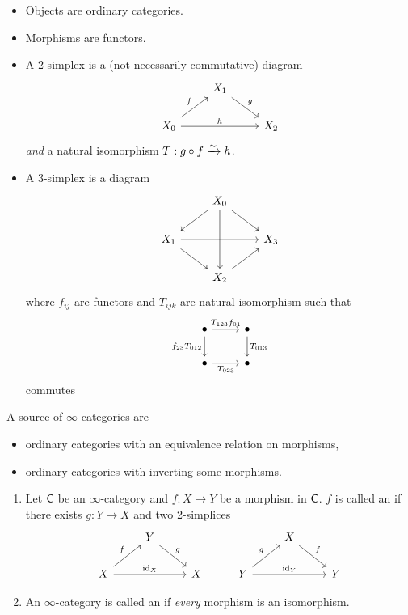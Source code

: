 \begin{example}
\begin{enumerate}[1)]
			\begin{itemize}
				\item Objects are ordinary categories.
				\item Morphisms are functors. 
				\item A 2-simplex is a (not necessarily commutative) diagram
					\[
					\begin{tikzcd}
						& X_1 \ar[dr,"g"] \\
						X_0 \ar[ur,"f"] \ar[rr,"h"] & & X_2
					\end{tikzcd}
					\] 
					\emph{and} a natural isomorphism $T:g\circ f \xrightarrow{\sim} h$.
				\item A 3-simplex is a diagram
					\[
					\begin{tikzcd}
						& X_0 \ar[dl] \ar[dr] \ar[dd] \\
						X_1 \ar[rr] \ar[dr] & & X_3 \\
								    & X_2 \ar[ur]
					\end{tikzcd}
					\]
					where $f_{ij}$ are functors and $T_{ijk}$ are natural isomorphism such that
					\[
					\begin{tikzcd}
						\bullet \ar[r,"T_{123}f_{01}"] \ar[d,"f_{23}T_{012}"'] & \bullet \ar[d,"T_{013}"] \\
						\bullet \ar[r,"T_{023}"'] & \bullet
					\end{tikzcd}
					\] 
					commutes
			\end{itemize}
	\end{enumerate}
\end{example}
A source of $\infty$-categories are
\begin{itemize}
	\item ordinary categories with an equivalence relation on morphisms,
	\item ordinary categories with inverting some morphisms.
\end{itemize}
\begin{definition} \leavevmode
\begin{enumerate}[1.]
	\item Let $\mathsf{C}$ be an $\infty$-category and $f:X\to Y$ be a morphism in $\mathsf{C}$. $f$ is called an  if there exists $g:Y\to X$ and two 2-simplices
		\[
		\begin{tikzcd}
			 & Y \ar[dr,"g"] & & & X \ar[dr,"f"] \\
			X \ar[ur,"f"] \ar[rr,"\id_X"] & & X & Y \ar[ur,"g"] \ar[rr,"\id_Y"] & & Y
		\end{tikzcd}
		\] 
	\item An $\infty$-category is called an  if \emph{every} morphism is an isomorphism.
\end{enumerate}
\end{definition}
